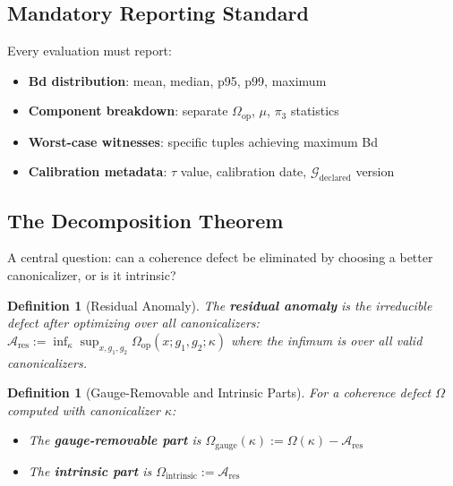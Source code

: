 \documentclass[12pt]{article}
\newtheorem{definition}[theorem]{Definition}
\begin{document}
\subsection{Mandatory Reporting Standard}

Every evaluation must report:
\begin{itemize}
    \item \textbf{Bd distribution}: mean, median, p95, p99, maximum
    \item \textbf{Component breakdown}: separate $\Omega_{\mathrm{op}}$, $\mu$, $\pi_3$ statistics
    \item \textbf{Worst-case witnesses}: specific tuples achieving maximum Bd
    \item \textbf{Calibration metadata}: $\tau$ value, calibration date, $\mathcal{G}_{\mathrm{declared}}$ version
\end{itemize}

\subsection{The Decomposition Theorem}

A central question: can a coherence defect be eliminated by choosing a better canonicalizer, or is it intrinsic?

\begin{definition}[Residual Anomaly]
\emph{The \textbf{residual anomaly} is the irreducible defect after optimizing over all canonicalizers:} $\mathcal{A}_{\mathrm{res}} := \inf_\kappa \sup_{x, g_1, g_2} \Omega_{\mathrm{op}}(x; g_1, g_2; \kappa)$ \emph{where the infimum is over all valid canonicalizers.}
\end{definition}

\begin{definition}[Gauge-Removable and Intrinsic Parts]
\emph{For a coherence defect $\Omega$ computed with canonicalizer $\kappa$:}
\begin{itemize}
    \item \emph{The \textbf{gauge-removable part} is} $\Omega_{\mathrm{gauge}}(\kappa) := \Omega(\kappa) - \mathcal{A}_{\mathrm{res}}$
    \item \emph{The \textbf{intrinsic part} is} $\Omega_{\mathrm{intrinsic}} := \mathcal{A}_{\mathrm{res}}$
\end{itemize}
\end{definition}
\end{document}
